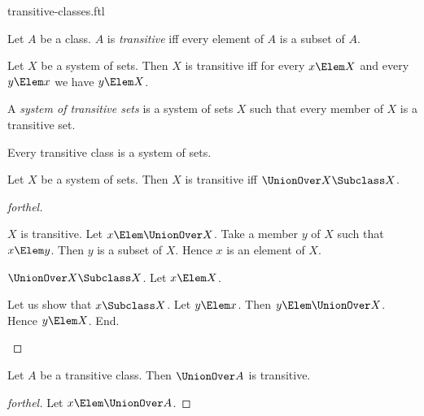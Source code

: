 \documentclass{stex}
\begin{document}
\begin{smodule}{transitive-classes.ftl}



\begin{definition*}[forthel,for=transitive]
  Let $A$ be a class.
  $A$ is \emph{transitive} iff every element of $A$ is a subset of $A$.
\end{definition*}

\begin{proposition*}[forthel]
  Let $X$ be a system of sets.
  Then $X$ is transitive iff for every $x \Elem X$ and every $y \Elem x$ we have $y \Elem X$.
\end{proposition*}

\begin{definition*}[forthel,for=system of transitive sets]
  A \emph{system of transitive sets} is a system of sets $X$ such that every member of $X$ is a transitive set.
\end{definition*}

\begin{proposition*}[forthel]
  Every transitive class is a system of sets.
\end{proposition*}

\begin{proposition*}[forthel]
  Let $X$ be a system of sets.
  Then $X$ is transitive iff $\UnionOver X \Subclass X$.
\end{proposition*}
\begin{proof}[forthel]
  \begin{case}{$X$ is transitive.}
    Let $x \Elem \UnionOver X$.
    Take a member $y$ of $X$ such that $x \Elem y$.
    Then $y$ is a subset of $X$.
    Hence $x$ is an element of $X$.
  \end{case}

  \begin{case}{$\UnionOver X \Subclass X$.}
    Let $x \Elem X$.

    Let us show that $x \Subclass X$.
      Let $y \Elem x$.
      Then $y \Elem \UnionOver X$.
      Hence $y \Elem X$.
    End.
  \end{case}
\end{proof}

\begin{proposition*}[forthel]
  Let $A$ be a transitive class.
  Then $\UnionOver A$ is transitive.
\end{proposition*}
\begin{proof}[forthel]
  Let $x \Elem \UnionOver A$.


\end{proof}
\end{smodule}
\end{document}

